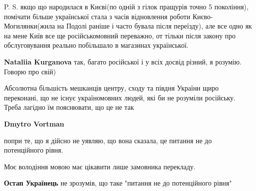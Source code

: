 \begin{itemize}
\begin{itemize}
P. S. якщо що народилася в Києві(по одній з гілок пращурів точно 5 покоління),
помічати більше української стала з часів відновлення роботи
Києво-Могилянки(жила на Подолі раніше і часто бувала після переїзду), але все
одно як на мене Київ все ще російськомовний переважно, от тільки після закону
про обслуговування реально побільшало в магазинах української.


 
\textbf{Nataliia Kurganova} так, багато російської і у всіх досвід різний, я
розумію. Говорю про свій)
\end{itemize}

 

Абсолютна більшість мешканців центру, сходу та півдня України щиро переконані,
що не існує україномовних людей, які би не розуміли російську. Треба лагідно їм
пояснювати, що це не так

\begin{itemize}

 
\textbf{Dmytro Vortman} 

попри те, що я дійсно не уявляю, що вона сказала, це питання не до потенційного
рівня.

Моє володіння мовою має цікавити лише замовника перекладу.


 
\textbf{Остап Українець} не зрозумів, що таке "питання не до потенційного рівня"


 

\end{itemize}
\end{itemize}
